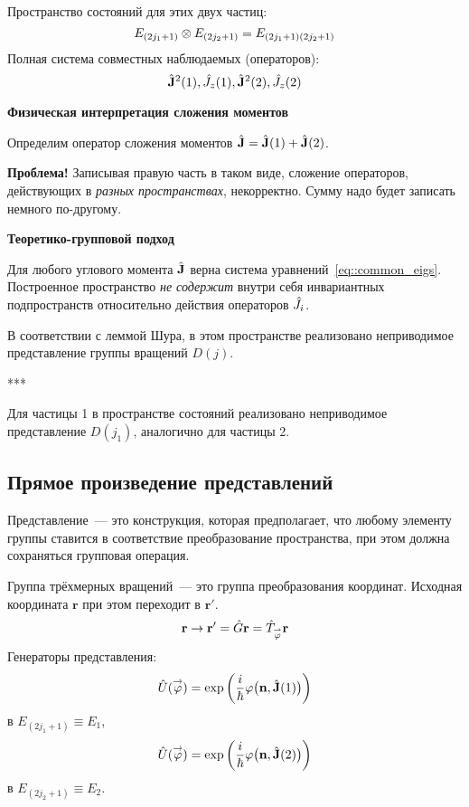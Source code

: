 Пространство состояний для этих двух частиц:
$$
    E_{(2j_1 + 1)} \otimes E_{(2j_2 + 1)} = E_{(2j_1 + 1)(2j_2 + 1)}
$$
Полная система совместных наблюдаемых (операторов):
$$
    \Hat{\mathbf J}^2 (1), \Hat J_z(1), \Hat{\mathbf J}^2(2), \Hat J_z(2)
$$

\textbf{Физическая интерпретация сложения моментов}

\def \vecJ {\Hat{\mathbf J}}
Определим оператор сложения моментов $\Hat {\mathbf J} = \Hat {\mathbf J}(1) + \Hat {\mathbf J}(2)$.

\textbf{Проблема!} Записывая правую часть в таком виде, сложение операторов, действующих в \emph{разных пространствах}, некорректно. Сумму надо будет записать немного по-другому.

\textbf{Теоретико-групповой подход} 


Для любого углового момента $\vecJ$ верна система уравнений~\eqref{eq::common_eigs}. Построенное пространство \emph{не содержит}  внутри себя инвариантных подпространств относительно действия операторов $\Hat J_i$.

В соответствии с леммой Шура, в этом пространстве реализовано неприводимое представление группы вращений $D(j)$.

***

Для частицы 1 в пространстве состояний реализовано неприводимое представление $D(j_1)$, аналогично для частицы 2.

\subsection{Прямое произведение представлений}

\Reminder Представление~--- это конструкция, которая предполагает, что любому элементу группы ставится в соответствие преобразование пространства, при этом должна сохраняться групповая операция.

Группа трёхмерных вращений~--- это группа преобразования координат. Исходная координата $\mathbf r$ при этом переходит в $\mathbf r'$.
\def \bf {\mathbf}
$$
    \bf r \to \bf r' = \Hat G \bf r = \Hat T_{\vec \phi} \bf r
$$
Генераторы представления:
$$
    \Hat U(\vec \phi) = \exp \left(
        \dfrac{i}{\hbar} \phi \big(\bf n, \vecJ (1)\big)
    \right)
$$
в $E_{(2j_1 + 1)} \equiv E_1$,
$$
    \Hat U(\vec \phi) = \exp \left(
        \dfrac{i}{\hbar} \phi \big(\bf n, \vecJ (2)\big)
    \right)
$$
в $E_{(2j_2 + 1)} \equiv E_2$.

